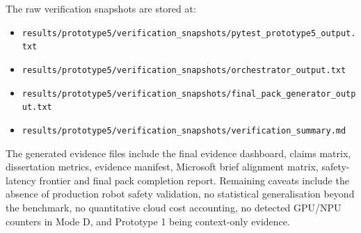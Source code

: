 \documentclass[sigconf,nonacm]{acmart}
\begin{document}
The raw verification snapshots are stored at:
\begin{itemize}
    \item \texttt{results/prototype5/verification\_snapshots/pytest\_prototype5\_output.txt}
    \item \texttt{results/prototype5/verification\_snapshots/orchestrator\_output.txt}
    \item \texttt{results/prototype5/verification\_snapshots/final\_pack\_generator\_output.txt}
    \item \texttt{results/prototype5/verification\_snapshots/verification\_summary.md}
\end{itemize}

The generated evidence files include the final evidence dashboard, claims matrix, dissertation metrics, evidence manifest, Microsoft brief alignment matrix, safety-latency frontier and final pack completion report. Remaining caveats include the absence of production robot safety validation, no statistical generalisation beyond the benchmark, no quantitative cloud cost accounting, no detected GPU/NPU counters in Mode D, and Prototype 1 being context-only evidence.




\end{document}
